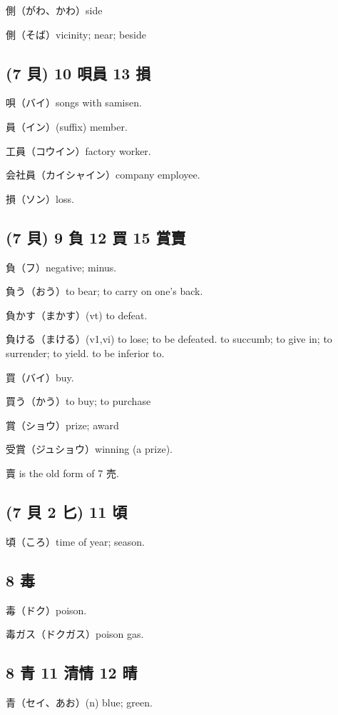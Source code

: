 側（がわ、かわ）side

側（そば）vicinity; near; beside

\subsection{(7 貝) 10 唄員 13 損}

唄（バイ）songs with samisen.

員（イン）(suffix) member.

工員（コウイン）factory worker.

会社員（カイシャイン）company employee.

損（ソン）loss.

\subsection{(7 貝) 9 負 12 買 15 賞賣}

負（フ）negative; minus.

負う（おう）to bear; to carry on one's back.

負かす（まかす）(vt) to defeat.

負ける（まける）(v1,vi)
to lose; to be defeated.
to succumb; to give in; to surrender; to yield.
to be inferior to.

買（バイ）buy.

買う（かう）to buy; to purchase

賞（ショウ）prize; award

受賞（ジュショウ）winning (a prize).

賣 is the old form of 7 売.

\subsection{(7 貝 2 匕) 11 頃}

頃（ころ）time of year; season.

\subsection{8 毒}

毒（ドク）poison.

毒ガス（ドクガス）poison gas.

\subsection{8 青 11 清情 12 晴}

青（セイ、あお）(n) blue; green.

